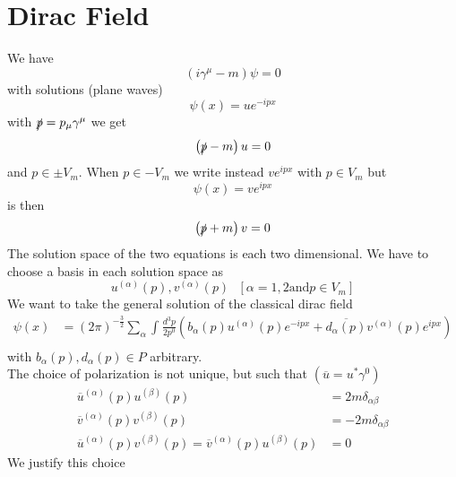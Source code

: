 \documentclass{report}
\begin{document}
\section{Dirac Field}
We have \[
\left( i \gamma^{\mu} - m \right) \psi = 0
\] 
with solutions (plane waves) \[
\psi\left( x \right) = u e^{-ipx} 
\] 
with $\slashed{p} = p_\mu \gamma^{\mu} $ we get \[
  \left( \slashed{p} - m \right) u = 0
\] and $p \in \pm V_m$. When $p \in - V_m$ we write instead $ve^{ipx} $ with $p \in V_m$ but \[
\psi\left( x \right) = v e^{ipx} 
\] is then \[
\left( \slashed{p} + m \right) v = 0
\] 
The solution space of the two equations is each two dimensional. We have to choose a basis in each solution space as
\[
u^{\left( \alpha \right) } \left( p \right) , v^{\left( \alpha \right) } \left( p \right)  \text{    } \left[ \alpha = 1,2 \text{and} p \in V_m \right] 
\] We want to take the general solution of the classical dirac field 
\begin{align*}
  \psi\left( x \right) &= \left( 2\pi \right) ^{-\frac{3}{2} } \sum_{\alpha}^{} \int_{}^{}  \frac{d^3p}{2p^{0} } \left(  b_\alpha \left( p \right) u^{\left( \alpha \right) } \left( p \right) e^{-ipx} + \overline{d_\alpha\left( p \right) } v^{\left( \alpha \right) } \left( p \right) e^{ipx}  \right)    \\
\end{align*}
with $b_\alpha\left( p \right) , d_\alpha\left( p \right) \in P $ arbitrary.\\
The choice of polarization is not unique, but such that $\left( \overline{u} = u^{*} \gamma^{0}  \right) $ 
\begin{align*}
  \overline{u}^{\left( \alpha \right) } \left( p \right) u^{\left( \beta \right) } \left( p \right) &= 2m \delta_{\alpha \beta}  \\
  \overline{v}^{\left( \alpha \right) } \left( p \right) v^{\left( \beta \right) } \left( p \right) &= -2 m \delta_{\alpha \beta}  \\ 
  \overline{u}^{\left( \alpha \right) } \left( p \right) v^{\left( \beta \right) } \left( p \right) = \overline{v}^{\left( \alpha \right) } \left( p \right) u^{\left( \beta \right) } \left( p \right) &= 0
\end{align*}
We justify this choice
\end{document}
